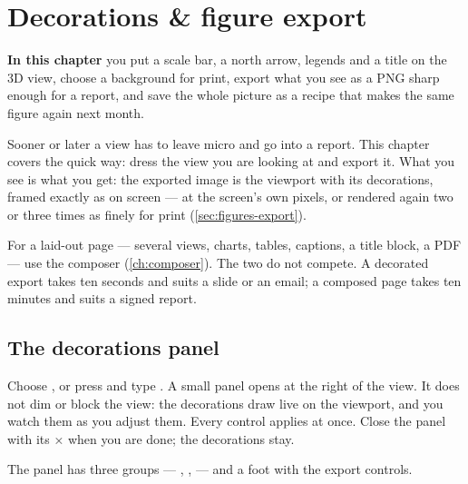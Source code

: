 \chapter{Decorations \& figure export}\label{ch:figures}
\begin{goals}
\textbf{In this chapter} you put a scale bar, a north arrow, legends and a title on the 3D view, choose a background for print, export what you see as a PNG sharp enough for a report, and save the whole picture as a recipe that makes the same figure again next month.
\end{goals}

Sooner or later a view has to leave micro and go into a report. This chapter covers the quick way: dress the view you are looking at and export it. What you see is what you get: the exported image is the viewport with its decorations, framed exactly as on screen — at the screen's own pixels, or rendered again two or three times as finely for print (\cref{sec:figures-export}).

For a laid-out page — several views, charts, tables, captions, a title block, a PDF — use the composer (\cref{ch:composer}). The two do not compete. A decorated export takes ten seconds and suits a slide or an email; a composed page takes ten minutes and suits a signed report.

\section{The decorations panel}\label{sec:figures-panel}

Choose , or press  and type . A small panel opens at the right of the view. It does not dim or block the view: the decorations draw live on the viewport, and you watch them as you adjust them. Every control applies at once. Close the panel with its × when you are done; the decorations stay.


The panel has three groups — , ,  — and a foot with the export controls.

